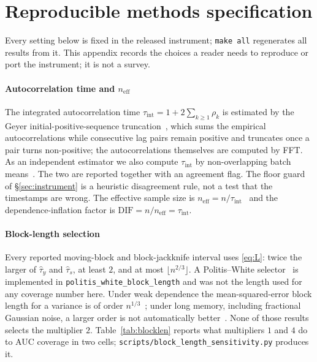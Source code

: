 \documentclass[a4paper,fleqn]{cas-dc}
\newcommand{\DIF}{\mathrm{DIF}}
\newcommand{\neff}{n_{\mathrm{eff}}}
\begin{document}
\section{Reproducible methods specification}
\label{app:methods}
Every setting below is fixed in the released instrument; \texttt{make all}
regenerates all results from it. This appendix records the choices a reader needs to reproduce or port
the instrument; it is not a survey.

\paragraph{Autocorrelation time and $\neff$} The integrated autocorrelation time
$\tau_{\mathrm{int}} = 1 + 2\sum_{k\ge 1}\rho_k$ is estimated by the Geyer initial-positive-sequence
truncation~\citep{geyer1992practical}, which sums the empirical autocorrelations while consecutive
lag pairs remain positive and truncates once a pair turns non-positive; the autocorrelations
themselves are computed by FFT. As an independent estimator we also compute $\tau_{\mathrm{int}}$ by
non-overlapping batch means~\citep{flegal2010batch}. The two are reported together with an
agreement flag. The floor guard of \S\ref{sec:instrument} is a heuristic disagreement rule, not a
test that the timestamps are wrong. The effective sample size is $\neff = n/\tau_{\mathrm{int}}$~\citep{geyer1992practical,vehtari2021ess} and the dependence-inflation
factor is $\DIF = n/\neff = \tau_{\mathrm{int}}$.

\paragraph{Block-length selection} Every reported moving-block and block-jackknife interval uses
\eqref{eq:L}: twice the larger of $\hat\tau_y$ and $\hat\tau_s$, at least $2$, and at most
$\lfloor n^{2/3}\rfloor$. A Politis--White selector~\citep{politis2004automatic,patton2009correction} is implemented in
\texttt{politis\_white\_block\_length} and was not the length used for any coverage number here.
Under weak dependence the mean-squared-error block length for a variance is of order
$n^{1/3}$~\citep{hall1995blocking}; under long memory, including fractional Gaussian noise, a larger
order is not automatically better~\citep{zhang2022block,lahiri2003resampling}. None of
those results selects the multiplier $2$. Table~\ref{tab:blocklen} reports what multipliers $1$ and
$4$ do to AUC coverage in two cells; \texttt{scripts/block\_length\_sensitivity.py} produces it.
\end{document}
